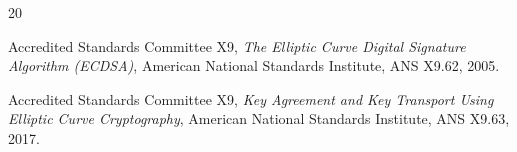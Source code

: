 \documentclass{llncs}
\begin{document}
\begin{thebibliography}{20}






Accredited Standards Committee X9,
\emph{The Elliptic Curve Digital Signature Algorithm (ECDSA)},
American National Standards Institute, ANS X9.62, 2005.

Accredited Standards Committee X9,
\emph{Key Agreement and Key Transport Using Elliptic Curve Cryptography},
American National Standards Institute, ANS X9.63, 2017.





\end{thebibliography}
\end{document}

